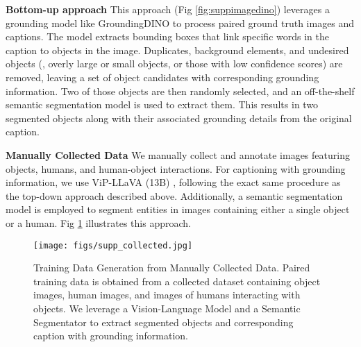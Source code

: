 \textbf{Bottom-up approach} This approach (Fig \ref{fig:suppimagedino}) leverages a grounding model like GroundingDINO \cite{liu2023groundingdino} to process paired ground truth images and captions. The model extracts bounding boxes that link specific words in the caption to objects in the image. Duplicates, background elements, and undesired objects (\eg, overly large or small objects, or those with low confidence scores) are removed, leaving a set of object candidates with corresponding grounding information. Two of those objects are then randomly selected, and an off-the-shelf semantic segmentation model \cite{qi2022entityseg} is used to extract them. This results in two segmented objects along with their associated grounding details from the original caption.



\noindent\textbf{Manually Collected Data} We manually collect and annotate images featuring objects, humans, and human-object interactions. For captioning with grounding information, we use ViP-LLaVA (13B) \cite{cai2024vip}, following the exact same procedure as the top-down approach described above. Additionally, a semantic segmentation model \cite{qi2022entityseg} is employed to segment entities in images containing either a single object or a human. Fig \ref{fig:suppcollected} illustrates this approach.






\begin{figure}[t]
    \centering
    \texttt{[image: figs/supp\_collected.jpg]}
    \caption{Training Data Generation from Manually Collected Data. Paired training data is obtained from a collected dataset containing object images, human images, and images of humans interacting with objects. We leverage a Vision-Language Model \cite{cai2024vip} and a Semantic Segmentator \cite{qi2022entityseg} to extract segmented objects and corresponding caption with grounding information.}
    \label{fig:suppcollected}
\end{figure}


